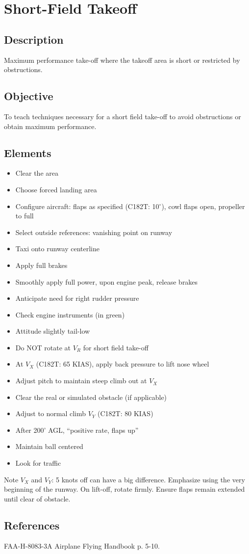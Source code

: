 \section{Short-Field Takeoff}

\subsection{Description}

Maximum performance take-off where the takeoff area is short or restricted by
obstructions.

\subsection{Objective}

To teach techniques necessary for a short field take-off to avoid obstructions
or obtain maximum performance.

\subsection{Elements}

\begin{itemize}
  \item Clear the area
  \item Choose forced landing area
  \item Configure aircraft: flaps as specified (C182T: 10$^\circ$), cowl flaps
    open, propeller to full
  \item Select outside references: vanishing point on runway
  \item Taxi onto runway centerline
  \item Apply full brakes
  \item Smoothly apply full power, upon engine peak, release brakes
  \item Anticipate need for right rudder pressure
  \item Check engine instruments (in green)
  \item Attitude slightly tail-low
  \item Do NOT rotate at $V_R$ for short field take-off
  \item At $V_X$ (C182T: 65 KIAS), apply back pressure to lift nose
    wheel
  \item Adjust pitch to maintain steep climb out at $V_X$
  \item Clear the real or simulated obstacle (if applicable)
  \item Adjust to normal climb $V_Y$ (C182T: 80 KIAS)
  \item After 200' AGL, ``positive rate, flaps up''
  \item Maintain ball centered 
  \item Look for traffic
\end{itemize}

Note $V_X$ and $V_Y$: 5 knots off can have a big difference. Emphasize using
the very beginning of the runway. On lift-off, rotate firmly. Ensure flaps
remain extended until clear of obstacle.

\subsection{References}

FAA-H-8083-3A Airplane Flying Handbook p. 5-10.

